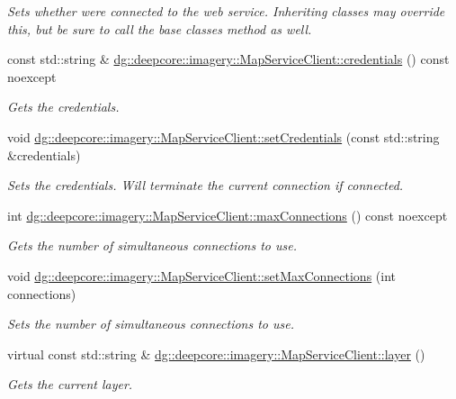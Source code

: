 \begin{DoxyCompactItemize}
\begin{DoxyCompactList}\small\item\em Sets whether we\textquotesingle{}re connected to the web service. Inheriting classes may override this, but be sure to call the base classe\textquotesingle{}s method as well. \end{DoxyCompactList}\item 
const std\+::string \& \hyperlink{group___imagery_module_gac4c03ea635c336ca2fe7de533706c11c}{dg\+::deepcore\+::imagery\+::\+Map\+Service\+Client\+::credentials} () const noexcept
\begin{DoxyCompactList}\small\item\em Gets the credentials. \end{DoxyCompactList}\item 
void \hyperlink{group___imagery_module_ga28ed4b8b833fa7785b0c456f79df0c40}{dg\+::deepcore\+::imagery\+::\+Map\+Service\+Client\+::set\+Credentials} (const std\+::string \&credentials)
\begin{DoxyCompactList}\small\item\em Sets the credentials. Will terminate the current connection if connected. \end{DoxyCompactList}\item 
int \hyperlink{group___imagery_module_ga772f97c22e6540f665946757800b2ed7}{dg\+::deepcore\+::imagery\+::\+Map\+Service\+Client\+::max\+Connections} () const noexcept
\begin{DoxyCompactList}\small\item\em Gets the number of simultaneous connections to use. \end{DoxyCompactList}\item 
void \hyperlink{group___imagery_module_ga8584ffb2dd25fce0f67842b72defb0cf}{dg\+::deepcore\+::imagery\+::\+Map\+Service\+Client\+::set\+Max\+Connections} (int connections)
\begin{DoxyCompactList}\small\item\em Sets the number of simultaneous connections to use. \end{DoxyCompactList}\item 
virtual const std\+::string \& \hyperlink{group___imagery_module_gafe3e2d18fb0c9ef72b3c23e97ead241f}{dg\+::deepcore\+::imagery\+::\+Map\+Service\+Client\+::layer} ()
\begin{DoxyCompactList}\small\item\em Gets the current layer. \end{DoxyCompactList}\item 

\end{DoxyCompactItemize}
